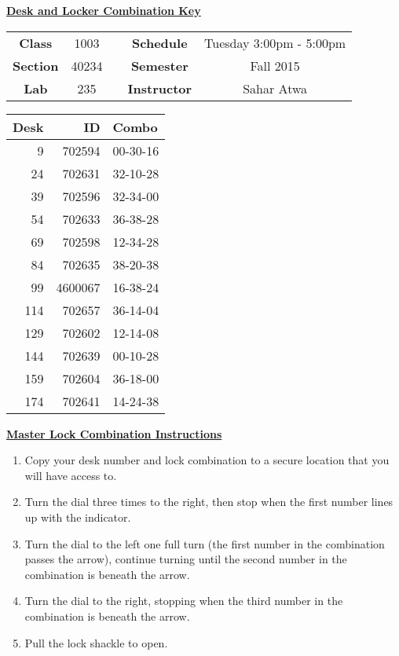 \documentclass[12pt]{article}
\begin{document}
\thispagestyle{empty}

\begin{center}
	{\huge\textbf{\underline{ Desk and Locker Combination Key}}}
\end{center}


\begin{table}[h]
  \centering
  \begin{tabular}{ccccc}

  \textbf{Class} & 1003 & {\qquad} &\textbf{Schedule} & Tuesday 3:00pm - 5:00pm \\
  \textbf{Section} & 40234 & {\qquad} & \textbf{Semester} & Fall 2015 \\
  \textbf{Lab} & 235 & {\qquad} & \textbf{Instructor} & Sahar Atwa \\
  \end{tabular}
\end{table}
 \vspace{0.5in}
\begin{minipage}{0.4\textwidth}

\begin{tabular}{rrl}
\toprule
 Desk &       ID &     Combo \\
\midrule
    9 &   702594 &  00-30-16 \\
   24 &   702631 &  32-10-28 \\
   39 &   702596 &  32-34-00 \\
   54 &   702633 &  36-38-28 \\
   69 &   702598 &  12-34-28 \\
   84 &   702635 &  38-20-38 \\
   99 &  4600067 &  16-38-24 \\
  114 &   702657 &  36-14-04 \\
  129 &   702602 &  12-14-08 \\
  144 &   702639 &  00-10-28 \\
  159 &   702604 &  36-18-00 \\
  174 &   702641 &  14-24-38 \\
\bottomrule
\end{tabular}


\end{minipage}
\begin{minipage}{0.4\textwidth}
\underline{{\large \textbf{Master Lock Combination Instructions}}}
\begin{enumerate}
\item Copy your desk number and lock combination to a secure location that you will have access to.
\item Turn the dial three times to the right, then stop when the first number lines up with the indicator.
\item Turn the dial to the left one full turn (the first number in the combination passes the arrow), continue turning until the second number in the combination is beneath the arrow.
\item Turn the dial to the right, stopping when the third number in the combination is beneath the arrow.
\item Pull the lock shackle to open.
\end{enumerate}
\end{minipage}
\end{document}
